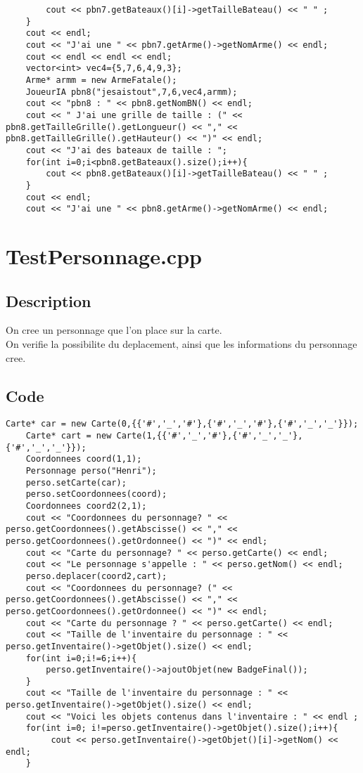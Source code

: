 \begin{lstlisting}
		cout << pbn7.getBateaux()[i]->getTailleBateau() << " " ;
	}
	cout << endl;
	cout << "J'ai une " << pbn7.getArme()->getNomArme() << endl;
	cout << endl << endl << endl;
	vector<int> vec4={5,7,6,4,9,3};
	Arme* armm = new ArmeFatale();
	JoueurIA pbn8("jesaistout",7,6,vec4,armm);
	cout << "pbn8 : " << pbn8.getNomBN() << endl;	
	cout << " J'ai une grille de taille : (" << pbn8.getTailleGrille().getLongueur() << "," << pbn8.getTailleGrille().getHauteur() << ")" << endl;
	cout << "J'ai des bateaux de taille : ";
	for(int i=0;i<pbn8.getBateaux().size();i++){
		cout << pbn8.getBateaux()[i]->getTailleBateau() << " " ;
	}
	cout << endl;
	cout << "J'ai une " << pbn8.getArme()->getNomArme() << endl;
	\end{lstlisting}
    \section{TestPersonnage.cpp}
        \subsection{Description}
            On cree un personnage que l'on place sur la carte.\\
            On verifie la possibilite du deplacement, ainsi que les informations du personnage cree.
        \subsection{Code}
\begin{lstlisting}
Carte* car = new Carte(0,{{'#','_','#'},{'#','_','#'},{'#','_','_'}});
	Carte* cart = new Carte(1,{{'#','_','#'},{'#','_','_'},{'#','_','_'}});
	Coordonnees coord(1,1);
	Personnage perso("Henri");
	perso.setCarte(car);
	perso.setCoordonnees(coord);
	Coordonnees coord2(2,1);
	cout << "Coordonnees du personnage? " << perso.getCoordonnees().getAbscisse() << "," << perso.getCoordonnees().getOrdonnee() << ")" << endl;
	cout << "Carte du personnage? " << perso.getCarte() << endl;
	cout << "Le personnage s'appelle : " << perso.getNom() << endl;
	perso.deplacer(coord2,cart);
	cout << "Coordonnees du personnage? (" << perso.getCoordonnees().getAbscisse() << "," << perso.getCoordonnees().getOrdonnee() << ")" << endl;
	cout << "Carte du personnage ? " << perso.getCarte() << endl;
	cout << "Taille de l'inventaire du personnage : " << perso.getInventaire()->getObjet().size() << endl;
	for(int i=0;i!=6;i++){
		perso.getInventaire()->ajoutObjet(new BadgeFinal());
	}
	cout << "Taille de l'inventaire du personnage : " << perso.getInventaire()->getObjet().size() << endl; 
	cout << "Voici les objets contenus dans l'inventaire : " << endl ;
	for(int i=0; i!=perso.getInventaire()->getObjet().size();i++){
		 cout << perso.getInventaire()->getObjet()[i]->getNom() << endl;
	}		
	\end{lstlisting}
